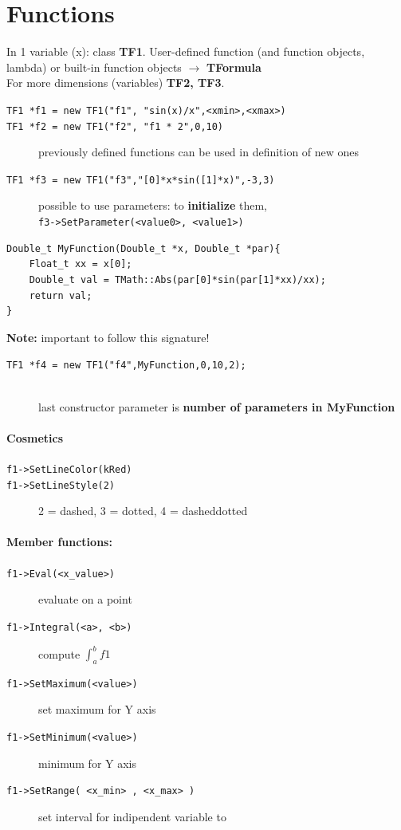 \documentclass[10pt, oneside]{article}
\begin{document}
\section{Functions}
In 1 variable (x): class \textbf{TF1}. User-defined function (and function objects, lambda) or built-in function objects $\rightarrow$ \textbf{TFormula}
\\For more dimensions (variables) \textbf{TF2, TF3}.
\begin{description}
\item[\texttt{TF1 *f1 = new TF1("f1", "sin(x)/x",<xmin>,<xmax>)}]
\item[\texttt{TF1 *f2 = new TF1("f2", "f1 * 2",0,10)}] previously defined functions can be used in definition of new ones
\item[\texttt{TF1 *f3 = new TF1("f3","[0]*x*sin([1]*x)",-3,3)}] possible to use parameters: to \textbf{initialize} them, \\\texttt{f3->SetParameter(<value0>, <value1>)}
\end{description}
\begin{verbatim}
Double_t MyFunction(Double_t *x, Double_t *par){ 
    Float_t xx = x[0];
    Double_t val = TMath::Abs(par[0]*sin(par[1]*xx)/xx); 
    return val;
}
\end{verbatim}
\textbf{Note:} important to follow this signature!
\begin{description}
\item[\texttt{TF1 *f4 = new TF1("f4",MyFunction,0,10,2);}] {}\,\\
last constructor parameter is \textbf{number of parameters in MyFunction}
\end{description}
\paragraph{Cosmetics}
\begin{description}
\item[\texttt{f1->SetLineColor(kRed)}]
\item[\texttt{f1->SetLineStyle(2)}] 2 = dashed, 3 = dotted, 4 = dasheddotted
\end{description}
\paragraph{Member functions:}
\begin{description}
\item[\texttt{f1->Eval(<x\_value>)}] evaluate on a point
\item[\texttt{f1->Integral(<a>, <b>)}] compute $\displaystyle \int_a^b f1$
\item[\texttt{f1->SetMaximum(<value>)}] set maximum for Y axis
\item[\texttt{f1->SetMinimum(<value>)}] minimum for Y axis
\item[\texttt{f1->SetRange( <x\_min> , <x\_max> )}] set interval for indipendent variable to \texttt{}
\end{description}
\end{document}
